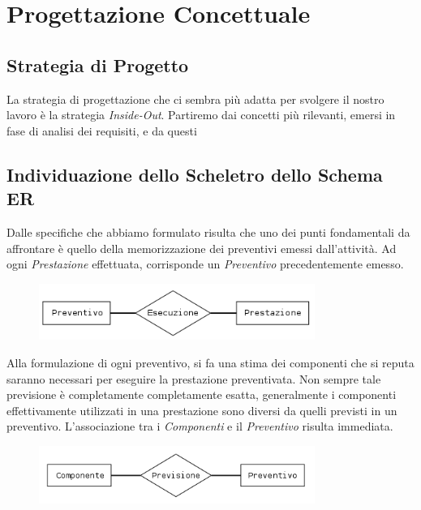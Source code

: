 \section{Progettazione Concettuale}
	
	\subsection{Strategia di Progetto}
		
		La strategia di progettazione che ci sembra più adatta per svolgere il nostro lavoro è la strategia \emph{Inside-Out}. Partiremo dai concetti più rilevanti, emersi in fase di analisi dei requisiti, e da questi 
						
		{\color{red}{Questa sezione va ampliata e corretta}}
		
	\subsection{Individuazione dello Scheletro dello Schema ER}
		
		Dalle specifiche che abbiamo formulato risulta che uno dei punti fondamentali da affrontare è quello della memorizzazione dei preventivi emessi dall'attività.
		Ad ogni \emph{Prestazione} effettuata, corrisponde un \emph{Preventivo} precedentemente emesso.
		
		\begin{figure}[H]
			\centering
			\includegraphics[width=9cm]{images/diagrams/preventivo_prestazione.png}
		\end{figure}
		
		Alla formulazione di ogni preventivo, si fa una stima dei componenti che si reputa saranno necessari per eseguire la prestazione preventivata. Non sempre tale previsione è completamente completamente esatta, generalmente i componenti effettivamente utilizzati in una prestazione sono diversi da quelli previsti in un preventivo.
		L'associazione tra i \emph{Componenti} e il \emph{Preventivo} risulta immediata.
		
		\begin{figure}[H]
			\centering
			\includegraphics[width=9cm]{images/diagrams/preventivo_componente.png}
		\end{figure}
		
